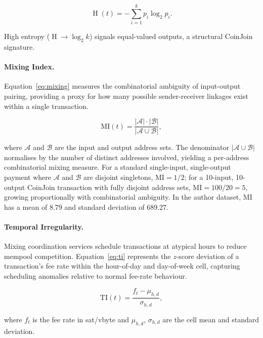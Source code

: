 \documentclass[12pt,a4paper]{article}
\DeclareMathOperator{\Entropy}{H}
\begin{document}
\begin{equation}
  \Entropy(t) = -\sum_{i=1}^{k} p_i \log_2 p_i.
  \label{eq:entropy}
\end{equation}

High entropy ($\Entropy \to \log_2 k$) signals equal-valued
outputs, a structural CoinJoin signature.

\paragraph{Mixing Index.}
Equation~\eqref{eq:mixing} measures the combinatorial
ambiguity of input-output pairing, providing a proxy for
how many possible sender-receiver linkages exist within
a single transaction.

\begin{equation}
  \text{MI}(t) = \frac{|\mathcal{A}| \cdot |\mathcal{B}|}
                      {|\mathcal{A} \cup \mathcal{B}|},
  \label{eq:mixing}
\end{equation}

where $\mathcal{A}$ and $\mathcal{B}$ are the input and
output address sets. The denominator $|\mathcal{A} \cup
\mathcal{B}|$ normalises by the number of distinct addresses
involved, yielding a per-address combinatorial mixing
measure. For a standard single-input, single-output payment
where $\mathcal{A}$ and $\mathcal{B}$ are disjoint singletons,
$\text{MI} = 1/2$; for a 10-input, 10-output CoinJoin
transaction with fully disjoint address sets,
$\text{MI} = 100/20 = 5$, growing proportionally with
combinatorial ambiguity. In the author dataset, MI has a
mean of 8.79 and standard deviation of 689.27.

\paragraph{Temporal Irregularity.}
Mixing coordination services schedule transactions at
atypical hours to reduce mempool competition.
Equation~\eqref{eq:ti} represents the $z$-score deviation
of a transaction's fee rate within the hour-of-day and
day-of-week cell, capturing scheduling anomalies relative
to normal fee-rate behaviour.

\begin{equation}
  \text{TI}(t) = \frac{f_t - \mu_{h,d}}{\sigma_{h,d}},
  \label{eq:ti}
\end{equation}

where $f_t$ is the fee rate in sat/vbyte and $\mu_{h,d}$,
$\sigma_{h,d}$ are the cell mean and standard deviation.
\end{document}
